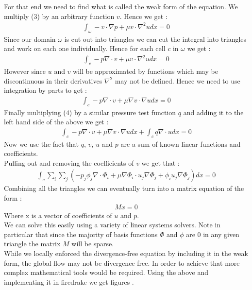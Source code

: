 \documentclass[11pt,twoside,a4paper]{article}
\begin{document}
For that end we need to find what is called the weak form of the equation. We multiply (3) by an arbitrary function $v$. Hence we get :
\begin{align*}
\int_{\omega} -v \cdot \nabla p + \mu v \cdot \nabla^2 u dx = 0
\end{align*}
Since our domain $\omega$ is cut out into triangles we can cut the integral into triangles and work on each one individually. Hence for each cell $c$ in $\omega$ we get : 
\begin{align*}
\int_{c} - p \nabla \cdot v + \mu v \cdot \nabla^2 u dx = 0
\end{align*}
However since $u$ and $v$ will be approximated by functions which may be discontinuous in their derivatives $\nabla^2$ may not be defined. Hence we need to use integration by parts to get :  
\begin{align*}
\int_{c} - p \nabla \cdot v + \mu \nabla v \cdot \nabla u dx = 0
\end{align*}
Finally multiplying (4) by a similar pressure test function $q$ and adding it to the left hand side of the above we get :
\begin{align}
\int_{c} - p \nabla \cdot v + \mu \nabla v \cdot \nabla u dx + \int_{c} q \nabla \cdot u dx = 0
\end{align}
Now we use the fact that $q$, $v$, $u$ and $p$ are a sum of known linear functions and coefficients.\\
Pulling out and removing the coefficients of $v$ we get that :
\begin{align*}
 \int_{c} \sum_i \sum_j ( - p_j \phi_j \nabla  \cdot \Phi_i + \mu \nabla \Phi_i \cdot u_j \nabla \Phi_j +   \phi_i u_j \nabla \Phi_j) dx = 0
\end{align*}
Combining all the triangles we can eventually turn into a matrix equation of the form :
\begin{align}
M x = 0
\end{align}
Where x is a vector of coefficients of $u$ and $p$.\\
We can solve this easily using a variety of linear systems solvers. Note in particular that since the majority of basis functions $\Phi$ and $\phi$ are $0$ in any given triangle the matrix $M$ will be sparse.\\
While we locally enforced the divergence-free equation by including it in the weak form, the global flow may not be divergence-free. In order to achieve that more complex mathematical tools would be required.
Using the above and implementing it in firedrake we get figures .
\end{document}
